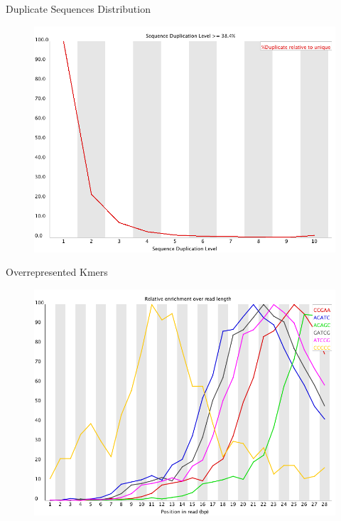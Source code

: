 \begin{frame}{Duplicate Sequences Distribution}

\begin{figure}[htbp]
\centering
\includegraphics[width=\textwidth,height=0.8\textheight,keepaspectratio]{images/duplication_levels}
\end{figure}

\end{frame}

\begin{frame}{Overrepresented Kmers}

\begin{figure}[htbp]
\centering
\includegraphics[width=\textwidth,height=0.8\textheight,keepaspectratio]{images/kmer_profiles}
\end{figure}

\end{frame}
